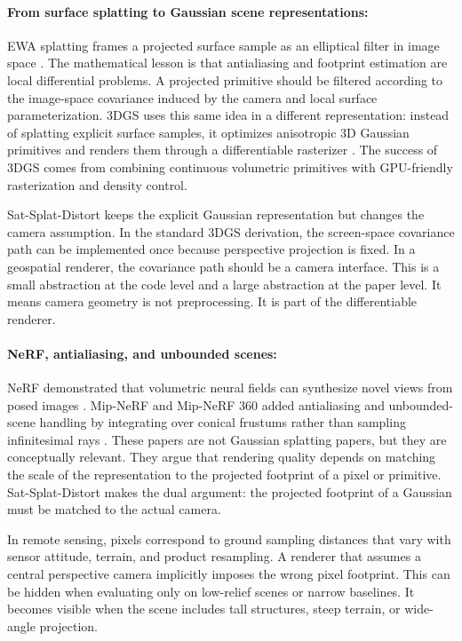 \documentclass{article}
\begin{document}
\paragraph{From surface splatting to Gaussian scene representations:}

EWA splatting frames a projected surface sample as an elliptical filter in image space \citep{zwicker2002ewa}. The mathematical lesson is that antialiasing and footprint estimation are local differential problems. A projected primitive should be filtered according to the image-space covariance induced by the camera and local surface parameterization. 3DGS uses this same idea in a different representation: instead of splatting explicit surface samples, it optimizes anisotropic 3D Gaussian primitives and renders them through a differentiable rasterizer \citep{kerbl20233d}. The success of 3DGS comes from combining continuous volumetric primitives with GPU-friendly rasterization and density control.

Sat-Splat-Distort keeps the explicit Gaussian representation but changes the camera assumption. In the standard 3DGS derivation, the screen-space covariance path can be implemented once because perspective projection is fixed. In a geospatial renderer, the covariance path should be a camera interface. This is a small abstraction at the code level and a large abstraction at the paper level. It means camera geometry is not preprocessing. It is part of the differentiable renderer.

\paragraph{NeRF, antialiasing, and unbounded scenes:}

NeRF demonstrated that volumetric neural fields can synthesize novel views from posed images \citep{mildenhall2020nerf}. Mip-NeRF and Mip-NeRF 360 added antialiasing and unbounded-scene handling by integrating over conical frustums rather than sampling infinitesimal rays \citep{barron2022mipnerf360}. These papers are not Gaussian splatting papers, but they are conceptually relevant. They argue that rendering quality depends on matching the scale of the representation to the projected footprint of a pixel or primitive. Sat-Splat-Distort makes the dual argument: the projected footprint of a Gaussian must be matched to the actual camera.

In remote sensing, pixels correspond to ground sampling distances that vary with sensor attitude, terrain, and product resampling. A renderer that assumes a central perspective camera implicitly imposes the wrong pixel footprint. This can be hidden when evaluating only on low-relief scenes or narrow baselines. It becomes visible when the scene includes tall structures, steep terrain, or wide-angle projection.
\end{document}
